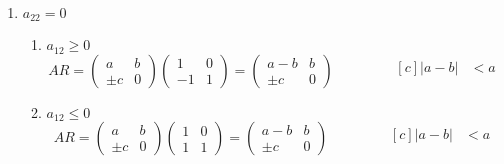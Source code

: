 \documentclass{article}
\newcommand\tab[1][0.6cm]{\hspace*{#1}}
\newcommand\nl{\newline\tab}
\begin{document}
\begin{enumerate}
\begin{enumerate}
			
			\end{enumerate}	
		\item $a_{22} = 0$
			\begin{enumerate}
				\item $a_{12} \geq 0$\nl
				$$AR = 
				\begin{pmatrix}
					a & b \\
					\pm c & 0 
				\end{pmatrix} 
				\begin{pmatrix}
					1 & 0 \\
					-1 & 1 
				\end{pmatrix} = 
				\begin{pmatrix}
					a-b & b \\
					\pm c & 0 
				\end{pmatrix}
				\qquad\qquad
				\begin{aligned}[c]
					|a - b| &< a\\
				\end{aligned}
				$$
				\item $a_{12} \leq 0$\nl
				$$AR = 
				\begin{pmatrix}
				a & b \\
				\pm c & 0 
				\end{pmatrix} 
				\begin{pmatrix}
				1 & 0 \\
				1 & 1 
				\end{pmatrix} = 
				\begin{pmatrix}
				a-b & b \\
				\pm c & 0 
				\end{pmatrix}
				\qquad\qquad
				\begin{aligned}[c]
				|a - b| &< a\\
				\end{aligned}
				$$\nl
			\end{enumerate}
	\end{enumerate}			
\end{document}
